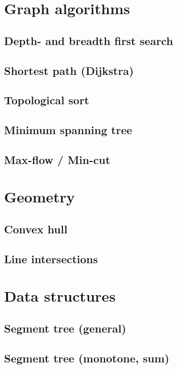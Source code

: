\documentclass[a4paper,10pt]{article}
\begin{document}
\section{Graph algorithms}
\subsection{Depth- and breadth first search}

\subsection{Shortest path (Dijkstra)}

\subsection{Topological sort}
\subsection{Minimum spanning tree}
\subsection{Max-flow / Min-cut}


\newpage
\section{Geometry}
\subsection{Convex hull}

\subsection{Line intersections}

\newpage
\section{Data structures}
\subsection{Segment tree (general)}

\subsection{Segment tree (monotone, sum)}

\end{document}
